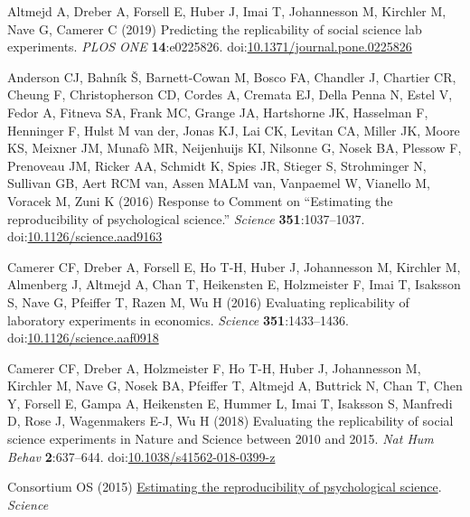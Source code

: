 \documentclass[
  english,
  a4paper,
]{article}
\newlength{\cslhangindent}
\newlength{\cslentryspacingunit} %
\newenvironment{CSLReferences}[2] %
 {%
  \setlength{\parindent}{0pt}
  \ifodd #1
  \let\oldpar\par
  \def\par{\hangindent=\cslhangindent\oldpar}
  \fi
  \setlength{\parskip}{#2\cslentryspacingunit}
 }%
 {}
\begin{document}
\hypertarget{refs}{}
\begin{CSLReferences}{1}{0}
\leavevmode{}%
Altmejd A, Dreber A, Forsell E, Huber J, Imai T, Johannesson M, Kirchler M, Nave G, Camerer C (2019) Predicting the replicability of social science lab experiments. \emph{PLOS ONE} \textbf{14}:e0225826. doi:\href{https://doi.org/10.1371/journal.pone.0225826}{10.1371/journal.pone.0225826}

\leavevmode{}%
Anderson CJ, Bahník Š, Barnett-Cowan M, Bosco FA, Chandler J, Chartier CR, Cheung F, Christopherson CD, Cordes A, Cremata EJ, Della Penna N, Estel V, Fedor A, Fitneva SA, Frank MC, Grange JA, Hartshorne JK, Hasselman F, Henninger F, Hulst M van der, Jonas KJ, Lai CK, Levitan CA, Miller JK, Moore KS, Meixner JM, Munafò MR, Neijenhuijs KI, Nilsonne G, Nosek BA, Plessow F, Prenoveau JM, Ricker AA, Schmidt K, Spies JR, Stieger S, Strohminger N, Sullivan GB, Aert RCM van, Assen MALM van, Vanpaemel W, Vianello M, Voracek M, Zuni K (2016) Response to {Comment} on {``{Estimating} the reproducibility of psychological science.''} \emph{Science} \textbf{351}:1037--1037. doi:\href{https://doi.org/10.1126/science.aad9163}{10.1126/science.aad9163}

\leavevmode{}%
Camerer CF, Dreber A, Forsell E, Ho T-H, Huber J, Johannesson M, Kirchler M, Almenberg J, Altmejd A, Chan T, Heikensten E, Holzmeister F, Imai T, Isaksson S, Nave G, Pfeiffer T, Razen M, Wu H (2016) Evaluating replicability of laboratory experiments in economics. \emph{Science} \textbf{351}:1433--1436. doi:\href{https://doi.org/10.1126/science.aaf0918}{10.1126/science.aaf0918}

\leavevmode{}%
Camerer CF, Dreber A, Holzmeister F, Ho T-H, Huber J, Johannesson M, Kirchler M, Nave G, Nosek BA, Pfeiffer T, Altmejd A, Buttrick N, Chan T, Chen Y, Forsell E, Gampa A, Heikensten E, Hummer L, Imai T, Isaksson S, Manfredi D, Rose J, Wagenmakers E-J, Wu H (2018) Evaluating the replicability of social science experiments in {Nature} and {Science} between 2010 and 2015. \emph{Nat Hum Behav} \textbf{2}:637--644. doi:\href{https://doi.org/10.1038/s41562-018-0399-z}{10.1038/s41562-018-0399-z}

\leavevmode{}%
Consortium OS (2015) \href{https://www.science.org/doi/full/10.1126/science.aac4716?casa_token=IJ35TwwlcjsAAAAA\%3AqiP68QbVAHleIg9zD3WugKWuV6Oa5rswS0VQnDsCq5I14ME4WIQabNGVD_T6SBSuAt6voVHNnWc0sw}{Estimating the reproducibility of psychological science}. \emph{Science}


\end{CSLReferences}
\end{document}
